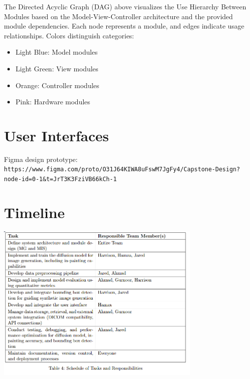 \documentclass[12pt, titlepage]{article}
\begin{document}
The Directed Acyclic Graph (DAG) above visualizes the Use Hierarchy Between Modules based on the Model-View-Controller architecture and the provided module dependencies. Each node represents a module, and edges indicate usage relationships. Colors distinguish categories:
\begin{itemize}
\item Light Blue: Model modules
\item Light Green: View modules
\item Orange: Controller modules
\item Pink: Hardware modules
\end{itemize}



\section{User Interfaces}
Figma design prototype:
\verb|https://www.figma.com/proto/O31J64KIWA8uFswM7JgFy4/Capstone-Design?node-id=0-1&t=JrT3K3FziVB66kCh-1|


\section{Timeline}
\includegraphics[width=10cm]{table}

\newpage{}
\end{document}
